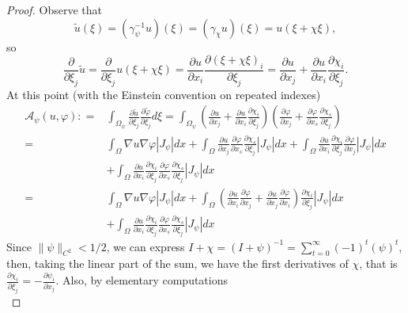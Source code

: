 \documentclass[a4paper,reqno,11pt,oneside]{amsart}
\theoremstyle{plain}
\theoremstyle{plain}
\theoremstyle{plain}
\theoremstyle{remark}
\begin{document}
\begin{proof}
Observe that
\begin{displaymath}
    \tilde u(\xi)=(\gamma_\psi^{-1} u)(\xi)=(\gamma_\chi u)(\xi) =u(\xi +\chi \xi), 
\end{displaymath}
so 
$$
\frac{\partial }{\partial \xi_j}\tilde u=\frac{\partial }{\partial \xi_j}u(\xi +\chi \xi)=
\frac{\partial u}{\partial x_i}
\frac{\partial (\xi +\chi \xi)_i}{ \partial \xi_j}
=\frac{\partial u}{\partial x_j}+
\frac{\partial u}{\partial x_i}\frac{\partial \chi_i}{ \partial \xi_j}.
$$
At this point (with the Einstein convention on repeated indexes)
\begin{align*}
\mathcal{A}_\psi(u,\varphi):
=&
\int_{\Omega_\psi} \frac{\partial \tilde u }{\partial \xi_j}\frac{\partial \tilde \varphi }{\partial \xi_j}d\xi
=\int_{\Omega_\psi} 
\left(
\frac{\partial u}{\partial x_j}+
\frac{\partial u}{\partial x_i}\frac{\partial \chi_i}{ \partial \xi_j}
\right)
\left(
\frac{\partial \varphi}{\partial x_j}+
\frac{\partial \varphi}{\partial x_s}\frac{\partial \chi_s}{ \partial \xi_j}
\right)\\
=&\int_\Omega \nabla u \nabla \varphi |J_\psi| dx+
\int_\Omega \frac{\partial u}{\partial x_j}
\frac{\partial \varphi}{\partial x_s}\frac{\partial \chi_s}{ \partial \xi_j}
|J_\psi| dx
+\int_\Omega \frac{\partial u}{\partial x_i}\frac{\partial \chi_i}{ \partial \xi_j}\frac{\partial \varphi}{\partial x_j}|J_\psi| dx\\
&+\int_\Omega \frac{\partial u}{\partial x_i}\frac{\partial \chi_i}{ \partial \xi_j}
\frac{\partial \varphi}{\partial x_s}\frac{\partial \chi_s}{ \partial \xi_j}
|J_\psi| dx\\
=&\int_\Omega \nabla u \nabla \varphi |J_\psi| dx+
\int_\Omega 
\left(\frac{\partial u}{\partial x_i}\frac{\partial \varphi}{\partial x_j}+
\frac{\partial u}{\partial x_j}\frac{\partial \varphi}{\partial x_i}
\right)\frac{\partial \chi_i}{ \partial \xi_j}
|J_\psi| dx\\
&+\int_\Omega \frac{\partial u}{\partial x_i}\frac{\partial \chi_i}{ \partial \xi_j}
\frac{\partial \varphi}{\partial x_s}\frac{\partial \chi_s}{ \partial \xi_j}
|J_\psi| dx
\end{align*}
Since $\|\psi\|_{C^2}<1/2$, we can express $I+\chi=(I+\psi)^{-1}=\sum_{t=0}^\infty (-1)^t(\psi)^t$, then, taking the linear part of the sum, we have the first derivatives of $\chi$, that is $\frac {\partial \chi_i}{\partial \xi_j} =-\frac {\partial \psi_i}{\partial x_j}$.
Also, by elementary computations
\begin{equation}

\end{equation}
\end{proof}
\end{document}
